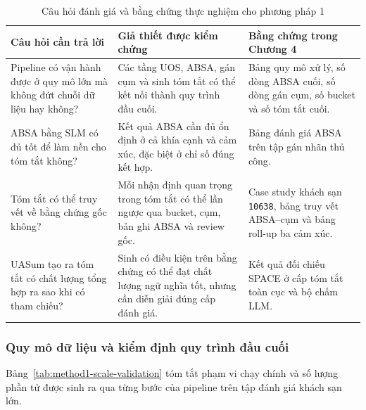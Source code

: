 \begin{table}[tbp]
\centering
\caption{Câu hỏi đánh giá và bằng chứng thực nghiệm cho phương pháp 1}
\label{tab:method1-evaluation-map}
\small
\setlength{\tabcolsep}{4pt}
\renewcommand{\arraystretch}{1.12}
\begin{tabularx}{\textwidth}{L{0.30\textwidth} L{0.31\textwidth} Y}
\toprule
\textbf{Câu hỏi cần trả lời} & \textbf{Giả thiết được kiểm chứng} & \textbf{Bằng chứng trong Chương 4} \\
\midrule
Pipeline có vận hành được ở quy mô lớn mà không đứt chuỗi dữ liệu hay không? & Các tầng UOS, ABSA, gán cụm và sinh tóm tắt có thể kết nối thành quy trình đầu cuối. & Bảng quy mô xử lý, số dòng ABSA cuối, số dòng gán cụm, số bucket và số tóm tắt cuối. \\
ABSA bằng SLM có đủ tốt để làm nền cho tóm tắt không? & Kết quả ABSA cần đủ ổn định ở cả khía cạnh và cảm xúc, đặc biệt ở chỉ số đúng kết hợp. & Bảng đánh giá ABSA trên tập gán nhãn thủ công. \\
Tóm tắt có thể truy vết về bằng chứng gốc không? & Mỗi nhận định quan trọng trong tóm tắt có thể lần ngược qua bucket, cụm, bản ghi ABSA và review gốc. & Case study khách sạn \texttt{10638}, bảng truy vết ABSA--cụm và bảng roll-up ba cảm xúc. \\
UASum tạo ra tóm tắt có chất lượng tổng hợp ra sao khi có tham chiếu? & Sinh có điều kiện trên bằng chứng có thể đạt chất lượng ngữ nghĩa tốt, nhưng cần diễn giải đúng cấp đánh giá. & Kết quả đối chiếu SPACE ở cấp tóm tắt toàn cục và bộ chấm LLM. \\
\bottomrule
\end{tabularx}
\end{table}

\subsubsection{Quy mô dữ liệu và kiểm định quy trình đầu cuối}
\label{subsec:method1-scale-validation}

Bảng~\ref{tab:method1-scale-validation} tóm tắt phạm vi chạy chính và số lượng phần tử được sinh ra qua từng bước của pipeline trên tập đánh giá khách sạn lớn.

